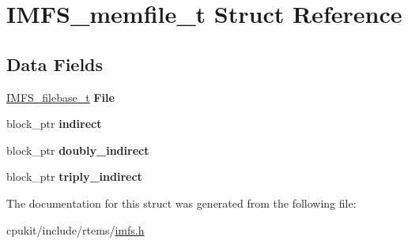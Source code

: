 \hypertarget{structIMFS__memfile__t}{}\section{I\+M\+F\+S\+\_\+memfile\+\_\+t Struct Reference}
\label{structIMFS__memfile__t}
\subsection*{Data Fields}
\begin{DoxyCompactItemize}
\item 
\mbox{\label{structIMFS__memfile__t_af9919403478ae5b8cdd86fc57e6479f6}} 
\mbox{\hyperlink{structIMFS__filebase__t}{I\+M\+F\+S\+\_\+filebase\+\_\+t}} {\bfseries File}
\item 
\mbox{\label{structIMFS__memfile__t_a50ff822825c0a821432615128837f2ea}} 
block\+\_\+ptr {\bfseries indirect}
\item 
\mbox{\label{structIMFS__memfile__t_a2c2d7f51ddcdb61eb40f29cbe152c7ee}} 
block\+\_\+ptr {\bfseries doubly\+\_\+indirect}
\item 
\mbox{\label{structIMFS__memfile__t_a5243247209e94b7669891f9337c63ae9}} 
block\+\_\+ptr {\bfseries triply\+\_\+indirect}
\end{DoxyCompactItemize}


The documentation for this struct was generated from the following file\+:\begin{DoxyCompactItemize}
\item 
cpukit/include/rtems/\mbox{\hyperlink{imfs_8h}{imfs.\+h}}\end{DoxyCompactItemize}
